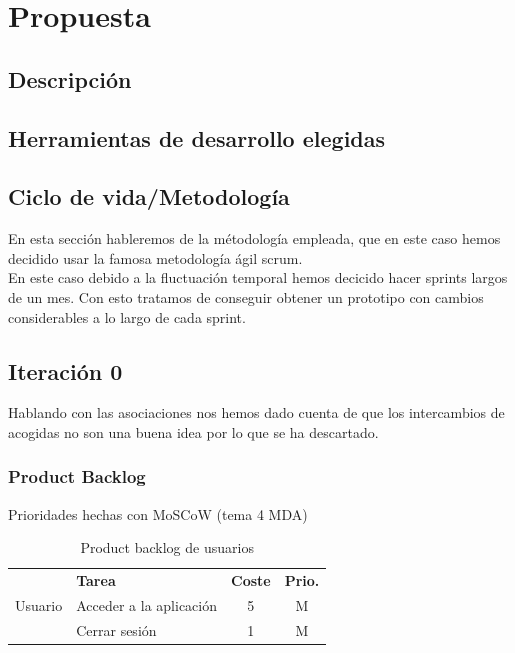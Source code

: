 \section{Propuesta}

\subsection{Descripción}

\subsection{Herramientas de desarrollo elegidas}

\subsection{Ciclo de vida/Metodología}
En esta sección hableremos de la métodología empleada, que en este caso hemos decidido usar la famosa metodología ágil scrum. \\

En este caso debido a la fluctuación temporal hemos decicido hacer sprints largos de un mes. Con esto tratamos de conseguir obtener un prototipo con cambios considerables a lo largo de cada sprint.


\subsection{Iteración 0}

Hablando con las asociaciones nos hemos dado cuenta de que los intercambios de acogidas no son una buena idea por lo que se ha descartado. \\
\subsubsection{Product Backlog}
Prioridades hechas con MoSCoW (tema 4 MDA)
\begin{table}[H]
    \centering
    \begin{tabular}{|c |p{8cm}|c |c|} \hline 
         \multirow[c]{3}{*}{Usuario}&  \textbf{Tarea}&  \textbf{Coste}& \textbf{Prio.}\\  \cline{2-4}%
         &  Acceder a la aplicación&  5& M\\ \cline{2-4} 
         &  Cerrar sesión&  1& M\\ \hline 
    \end{tabular}
    \caption{Product backlog de usuarios}
    \label{tab:pb_usuarios}
\end{table}

